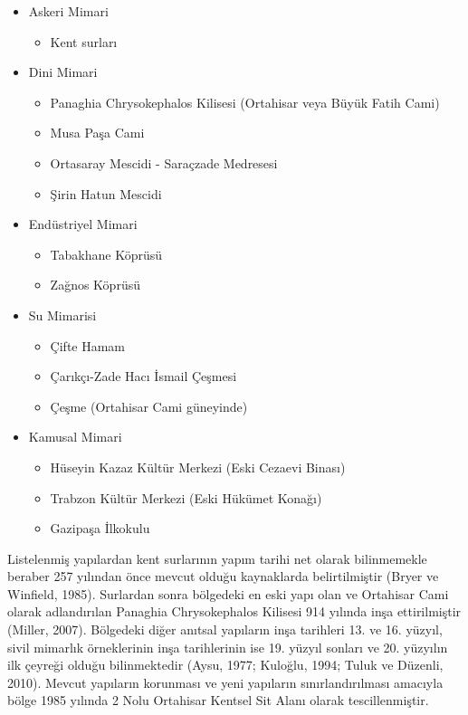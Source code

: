 \documentclass[12pt,turkish,a4paperpaper,]{report}
\providecommand{\tightlist}{%
  \setlength{\itemsep}{0pt}\setlength{\parskip}{0pt}}
\begin{document}
\begin{itemize}
\tightlist
\item
  Askeri Mimari

  \begin{itemize}
  \tightlist
  \item
    Kent surları
  \end{itemize}
\item
  Dini Mimari

  \begin{itemize}
  \tightlist
  \item
    Panaghia Chrysokephalos Kilisesi (Ortahisar veya Büyük Fatih Cami)
  \item
    Musa Paşa Cami
  \item
    Ortasaray Mescidi - Saraçzade Medresesi
  \item
    Şirin Hatun Mescidi
  \end{itemize}
\item
  Endüstriyel Mimari

  \begin{itemize}
  \tightlist
  \item
    Tabakhane Köprüsü
  \item
    Zağnos Köprüsü
  \end{itemize}
\item
  Su Mimarisi

  \begin{itemize}
  \tightlist
  \item
    Çifte Hamam
  \item
    Çarıkçı-Zade Hacı İsmail Çeşmesi
  \item
    Çeşme (Ortahisar Cami güneyinde)
  \end{itemize}
\item
  Kamusal Mimari

  \begin{itemize}
  \tightlist
  \item
    Hüseyin Kazaz Kültür Merkezi (Eski Cezaevi Binası)
  \item
    Trabzon Kültür Merkezi (Eski Hükümet Konağı)
  \item
    Gazipaşa İlkokulu
  \end{itemize}
\end{itemize}

Listelenmiş yapılardan kent surlarının yapım tarihi net olarak
bilinmemekle beraber 257 yılından önce mevcut olduğu kaynaklarda
belirtilmiştir (Bryer ve Winfield, 1985). Surlardan sonra bölgedeki en
eski yapı olan ve Ortahisar Cami olarak adlandırılan Panaghia
Chrysokephalos Kilisesi 914 yılında inşa ettirilmiştir (Miller, 2007).
Bölgedeki diğer anıtsal yapıların inşa tarihleri 13. ve 16. yüzyıl,
sivil mimarlık örneklerinin inşa tarihlerinin ise 19. yüzyıl sonları ve
20. yüzyılın ilk çeyreği olduğu bilinmektedir (Aysu, 1977; Kuloğlu,
1994; Tuluk ve Düzenli, 2010). Mevcut yapıların korunması ve yeni
yapıların sınırlandırılması amacıyla bölge 1985 yılında 2 Nolu Ortahisar
Kentsel Sit Alanı olarak tescillenmiştir.
\end{document}

